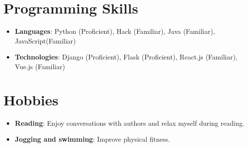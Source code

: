 \documentclass[letterpaper,11pt]{article}
\newcommand{\resumeItem}[2]{
  \item\small{
    \textbf{#1}{: #2 \vspace{-2pt}}
  }
}
\newcommand{\resumeSubItem}[2]{\resumeItem{#1}{#2}\vspace{-4pt}}
\newcommand{\resumeSubHeadingListStart}{\begin{itemize}[leftmargin=*]}
\newcommand{\resumeSubHeadingListEnd}{\end{itemize}}
\begin{document}
\section{Programming Skills}
  \resumeSubHeadingListStart
    \resumeSubItem{Languages}
    {Python (Proficient), Hack (Familiar), Java (Familiar), JavaScript(Familiar)}
    \resumeSubItem{Technologies}
    {Django (Proficient), Flask (Proficient), React.js (Familiar), Vue.js (Familiar)}
 \resumeSubHeadingListEnd

\section{Hobbies}
  \resumeSubHeadingListStart
    \resumeSubItem{Reading}
    {Enjoy conversations with authors and relax myself during reading.}
    \resumeSubItem{Jogging and swimming} 
    {Improve physical fitness. }
 \resumeSubHeadingListEnd


\end{document}
